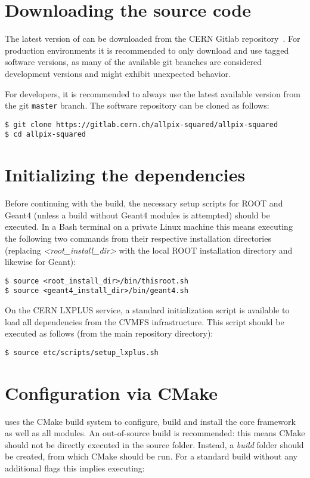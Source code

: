 \section{Downloading the source code}
The latest version of \apsq can be downloaded from the CERN Gitlab repository~\cite{ap2-repo}.
For production environments it is recommended to only download and use tagged software versions, as many of the available git branches are considered development versions and might exhibit unexpected behavior.

For developers, it is recommended to always use the latest available version from the git \texttt{master} branch.
The software repository can be cloned as follows:

\begin{verbatim}
$ git clone https://gitlab.cern.ch/allpix-squared/allpix-squared
$ cd allpix-squared
\end{verbatim}

\section{Initializing the dependencies}
\label{sec:initialize_dependencies}
Before continuing with the build, the necessary setup scripts for ROOT and Geant4 (unless a build without Geant4 modules is attempted) should be executed.
In a Bash terminal on a private Linux machine this means executing the following two commands from their respective installation directories (replacing \textit{\textless root\_install\_dir\textgreater} with the local ROOT installation directory and likewise for Geant):
\begin{verbatim}
$ source <root_install_dir>/bin/thisroot.sh
$ source <geant4_install_dir>/bin/geant4.sh
\end{verbatim}

On the CERN LXPLUS service, a standard initialization script is available to load all dependencies from the CVMFS infrastructure.
This script should be executed as follows (from the main repository directory):
\begin{verbatim}
$ source etc/scripts/setup_lxplus.sh
\end{verbatim}

\section{Configuration via CMake}
\label{sec:cmake_config}
\apsq uses the CMake build system to configure, build and install the core framework as well as all modules.
An out-of-source build is recommended: this means CMake should not be directly executed in the source folder.
Instead, a \textit{build} folder should be created, from which CMake should be run.
For a standard build without any additional flags this implies executing:

